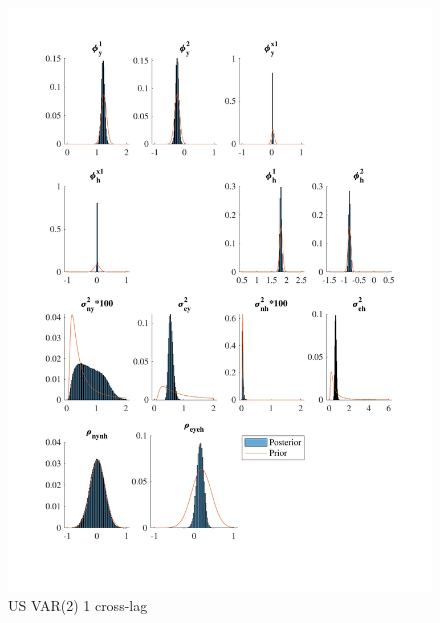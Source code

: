 \documentclass[
  12pt,
]{article}
\begin{document}
\begin{figure}

{\centering \includegraphics[width=0.85\linewidth]{../../Regression/Bayesian_UC_VAR2_drift_Crosscycle1lag/OutputData/posteriorpriordistribution_US} 

}

\caption{US VAR(2) 1 cross-lag}\label{fig:unnamed-chunk-13}
\end{figure}
\end{document}
